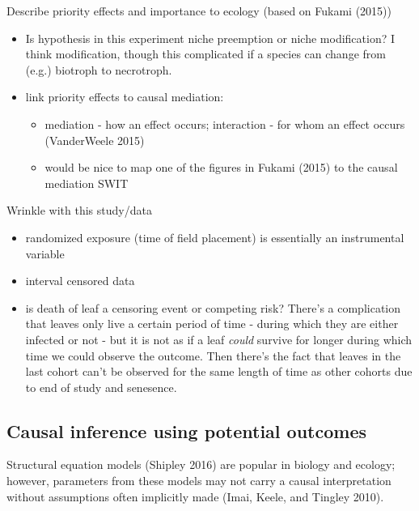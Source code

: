 \documentclass[]{article}
\providecommand{\tightlist}{%
  \setlength{\itemsep}{0pt}\setlength{\parskip}{0pt}}
\begin{document}
Describe priority effects and importance to ecology (based on Fukami
(2015))

\begin{itemize}
\tightlist
\item
  Is hypothesis in this experiment niche preemption or niche
  modification? I think modification, though this complicated if a
  species can change from (e.g.) biotroph to necrotroph.
\item
  link priority effects to causal mediation:

  \begin{itemize}
  \tightlist
  \item
    mediation - how an effect occurs; interaction - for whom an effect
    occurs (VanderWeele 2015)
  \item
    would be nice to map one of the figures in Fukami (2015) to the
    causal mediation SWIT
  \end{itemize}
\end{itemize}

Wrinkle with this study/data

\begin{itemize}
\tightlist
\item
  randomized exposure (time of field placement) is essentially an
  instrumental variable
\item
  interval censored data
\item
  is death of leaf a censoring event or competing risk? There's a
  complication that leaves only live a certain period of time - during
  which they are either infected or not - but it is not as if a leaf
  \emph{could} survive for longer during which time we could observe the
  outcome. Then there's the fact that leaves in the last cohort can't be
  observed for the same length of time as other cohorts due to end of
  study and senesence.
\end{itemize}

\hypertarget{causal-inference-using-potential-outcomes}{%
\subsection{Causal inference using potential
outcomes}\label{causal-inference-using-potential-outcomes}}

Structural equation models (Shipley 2016) are popular in biology and
ecology; however, parameters from these models may not carry a causal
interpretation without assumptions often implicitly made (Imai, Keele,
and Tingley 2010).
\end{document}
